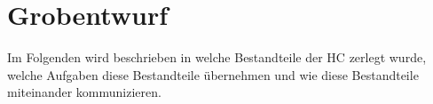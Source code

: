\section{Grobentwurf}
Im Folgenden wird beschrieben in welche Bestandteile der \ac{HC} zerlegt wurde, welche Aufgaben diese Bestandteile übernehmen und wie diese Bestandteile miteinander kommunizieren.

\newpage
\newpage
\newpage
 \newpage
\newpage




